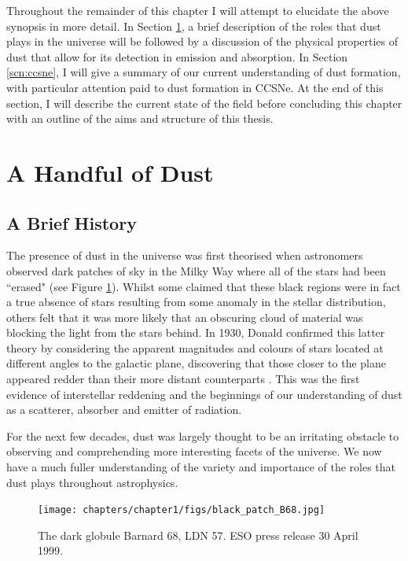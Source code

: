 Throughout the remainder of this chapter I will attempt to elucidate the above synopsis in more detail.  In Section \ref{scn:dust}, a brief description of the roles that dust plays in the universe will be followed by a discussion of the physical properties of dust that allow for its detection in emission and absorption.  In Section \ref{scn:ccsne}, I will give a summary of our current understanding of dust formation, with particular attention paid to dust formation in CCSNe.  At the end of this section, I will describe the current state of the field before concluding this chapter
with an outline of the aims and structure of this thesis.


\section{A Handful of Dust}
\label{scn:dust}

\subsection{A Brief History}

The presence of dust in the universe was first theorised when astronomers observed dark patches of sky in the Milky Way where all of the stars had been ``erased" (see Figure \ref{intro:fig:dustpatch}).  Whilst some claimed that these black regions were in fact a true absence of stars resulting from some anomaly in the stellar distribution, others felt that it was more likely that an obscuring cloud of material was blocking the light from the stars behind.  In 1930, Donald \citeauthor{Trumpler1930} confirmed this latter theory by considering the apparent magnitudes and colours of stars located at different angles to the galactic plane, discovering that those closer to the plane appeared redder than their more distant counterparts \citep{Trumpler1930}.  This was the first evidence of interstellar reddening and the beginnings of our understanding of dust as a scatterer, absorber and emitter of radiation.

For the next few decades, dust was largely thought to be  an irritating obstacle to observing and comprehending more interesting facets of the universe.  We now have a much fuller understanding of the variety and importance of the roles that dust plays throughout astrophysics.

\begin{figure}
\centering
\texttt{[image: chapters/chapter1/figs/black\_patch\_B68.jpg]}
\caption{The dark globule Barnard 68, LDN 57.  ESO press release 30 April 1999.}
\label{intro:fig:dustpatch}
\end{figure}

